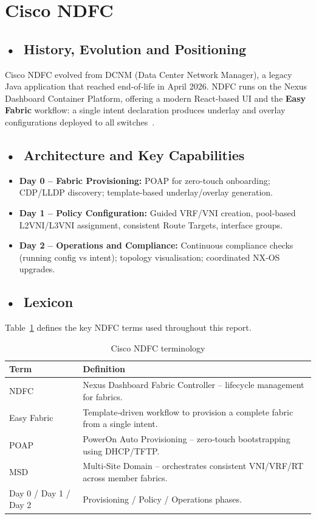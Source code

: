\section{Cisco NDFC}

\subsection*{\mbox{•}~History, Evolution and Positioning}
Cisco NDFC evolved from DCNM (Data Center Network Manager), a legacy Java application that reached end‑of‑life in April 2026. NDFC runs on the Nexus Dashboard Container Platform, offering a modern React‑based UI and the \textbf{Easy Fabric} workflow: a single intent declaration produces underlay and overlay configurations deployed to all switches~\cite{NDFC_Product_Documentation}.

\subsection*{\mbox{•}~Architecture and Key Capabilities}
\begin{itemize}
    \item \textbf{Day 0 – Fabric Provisioning:} POAP for zero‑touch onboarding; CDP/LLDP discovery; template‑based underlay/overlay generation.
    \item \textbf{Day 1 – Policy Configuration:} Guided VRF/VNI creation, pool‑based L2VNI/L3VNI assignment, consistent Route Targets, interface groups.
    \item \textbf{Day 2 – Operations and Compliance:} Continuous compliance checks (running config vs intent); topology visualisation; coordinated NX‑OS upgrades.
\end{itemize}

\subsection*{\mbox{•}~Lexicon}
Table~\ref{tab:ndfc-lexicon} defines the key NDFC terms used throughout this report.

\begin{table}[!htbp]
\centering
\small
\begin{tabularx}{\textwidth}{@{} >{\raggedright\arraybackslash}p{3.2cm} X @{}}
\toprule
Term & Definition \\
\midrule
NDFC & Nexus Dashboard Fabric Controller – lifecycle management for fabrics. \\
Easy Fabric & Template‑driven workflow to provision a complete fabric from a single intent. \\
POAP & PowerOn Auto Provisioning – zero‑touch bootstrapping using DHCP/TFTP. \\
MSD & Multi‑Site Domain – orchestrates consistent VNI/VRF/RT across member fabrics. \\
Day 0 / Day 1 / Day 2 & Provisioning / Policy / Operations phases. \\
\bottomrule
\end{tabularx}
\caption{Cisco NDFC terminology}
\label{tab:ndfc-lexicon}
\end{table}

